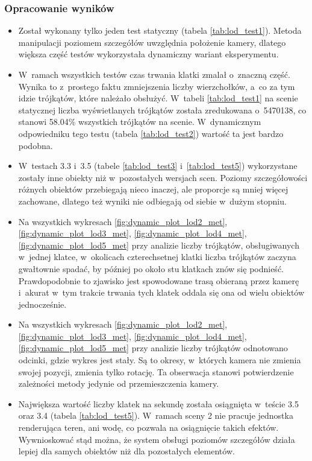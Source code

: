 \documentclass[a4paper,twoside,12pt]{book}
\begin{document}
\subsubsection{Opracowanie wyników}
\begin{itemize}
    \item Został wykonany tylko jeden test statyczny (tabela \ref{tab:lod_test1}). Metoda manipulacji poziomem szczegółów uwzględnia położenie kamery, dlatego większa część testów wykorzystała dynamiczny wariant eksperymentu.
    \item W~ramach wszystkich testów czas trwania klatki zmalał o~znaczną część. Wynika to z~prostego faktu zmniejszenia liczby wierzchołków, a~co za tym idzie trójkątów, które należało obsłużyć. W~tabeli \ref{tab:lod_test1} na scenie statycznej liczba wyświetlanych trójkątów została zredukowana o~5470138, co stanowi 58.04\% wszystkich trójkątów na scenie. W~dynamicznym odpowiedniku tego testu (tabela \ref{tab:lod_test2}) wartość ta jest bardzo podobna.
    \item W~testach 3.3 i~3.5 (tabele \ref{tab:lod_test3} i~\ref{tab:lod_test5}) wykorzystane zostały inne obiekty niż w~pozostałych wersjach scen. Poziomy szczegółowości różnych obiektów przebiegają nieco inaczej, ale proporcje są mniej więcej zachowane, dlatego też wyniki nie odbiegają od siebie w~dużym stopniu.
    \item Na wszystkich wykresach \ref{fig:dynamic_plot_lod2_met}, \ref{fig:dynamic_plot_lod3_met}, \ref{fig:dynamic_plot_lod4_met}, \ref{fig:dynamic_plot_lod5_met} przy analizie liczby trójkątów, obsługiwanych w~jednej klatce, w~okolicach czterechsetnej klatki liczba trójkątów zaczyna gwałtownie spadać, by później po około stu klatkach znów się podnieść. Prawdopodobnie to zjawisko jest spowodowane trasą obieraną przez kamerę i~akurat w~tym trakcie trwania tych klatek oddala się ona od wielu obiektów jednocześnie.
    \item Na wszystkich wykresach \ref{fig:dynamic_plot_lod2_met}, \ref{fig:dynamic_plot_lod3_met}, \ref{fig:dynamic_plot_lod4_met}, \ref{fig:dynamic_plot_lod5_met} przy analizie liczby trójkątów odnotowano odcinki, gdzie wykres jest stały. Są to okresy, w~których kamera nie zmienia swojej pozycji, zmienia tylko rotację. Ta obserwacja stanowi potwierdzenie zależności metody jedynie od przemieszczenia kamery.
    \item Największa wartość liczby klatek na sekundę została osiągnięta w~teście 3.5 oraz 3.4 (tabela \ref{tab:lod_test5}). W~ramach sceny 2 nie pracuje jednostka renderująca teren, ani wodę, co pozwala na osiągnięcie takich efektów. Wywnioskować stąd można, że system obsługi poziomów szczegółów działa lepiej dla samych obiektów niż dla pozostałych elementów.

\end{itemize}
\end{document}
